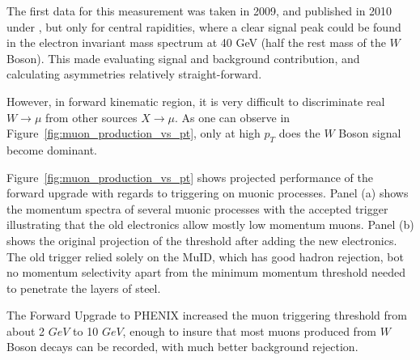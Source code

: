 The first data for this measurement was taken in 2009, and published in 2010
under \cite{Adare2010}, but only for central rapidities,
where a clear signal peak could be found in the electron invariant mass
spectrum at 40 GeV (half the rest mass of the $W$ Boson). This made evaluating
signal and background contribution,  and calculating asymmetries relatively
straight-forward. 

However, in forward kinematic region, it is very difficult to discriminate
real $W\rightarrow\mu$ from other sources $X\rightarrow\mu$. As one can observe
in Figure~\ref{fig:muon_production_vs_pt}, only at high $p_T$ does the $W$ Boson
signal become dominant. 

Figure~\ref{fig:muon_production_vs_pt} shows projected performance of the
forward upgrade with regards to triggering on muonic processes. Panel (a) shows
the momentum spectra of several muonic processes with the accepted trigger
illustrating that the old electronics allow mostly low momentum muons. Panel (b)
shows the original projection of the threshold after adding the new electronics.
The old trigger relied solely on the MuID, which has good hadron rejection, bot
no momentum selectivity apart from the minimum momentum threshold needed to
penetrate the layers of steel.

The Forward Upgrade to PHENIX increased the muon triggering threshold from about
2 $GeV$ to 10 $GeV$, enough to insure that most muons produced from $W$ Boson
decays can be recorded, with much better background rejection. 

